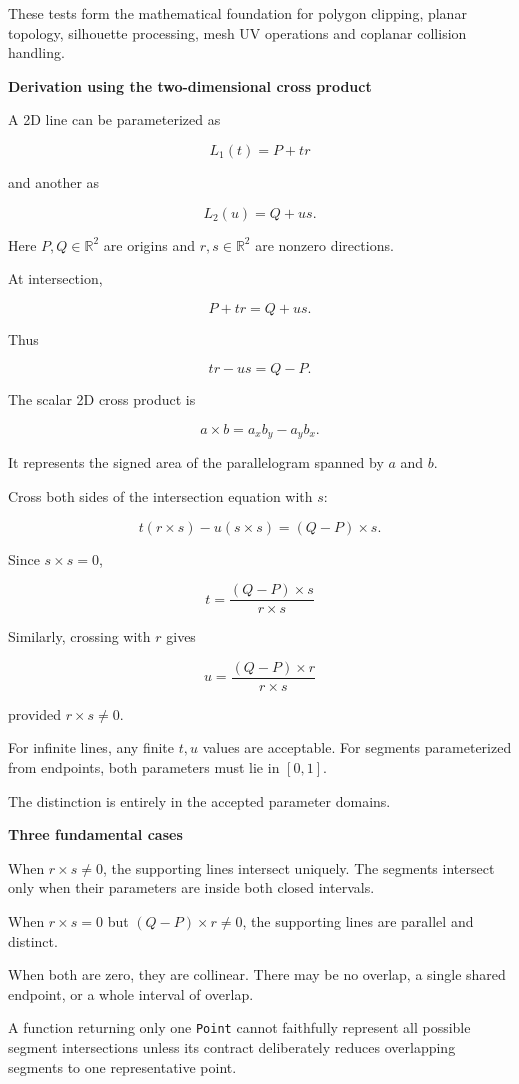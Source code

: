 These tests form the mathematical foundation for polygon clipping, planar topology, silhouette processing, mesh UV operations and coplanar collision handling.

\textbf{Derivation using the two-dimensional cross product}

A 2D line can be parameterized as

\[
L_1(t)=P+tr
\]

and another as

\[
L_2(u)=Q+us.
\]

Here \(P,Q\in\mathbb R^2\) are origins and \(r,s\in\mathbb R^2\) are nonzero directions.

At intersection,

\[
P+tr=Q+us.
\]

Thus

\[
tr-us=Q-P.
\]

The scalar 2D cross product is

\[
a\times b=a_xb_y-a_yb_x.
\]

It represents the signed area of the parallelogram spanned by \(a\) and \(b\).

Cross both sides of the intersection equation with \(s\):

\[
t(r\times s)-u(s\times s)=(Q-P)\times s.
\]

Since \(s\times s=0\),

\[
\boxed{ t=\frac{(Q-P)\times s}{r\times s} }
\]

Similarly, crossing with \(r\) gives

\[
\boxed{ u=\frac{(Q-P)\times r}{r\times s} }
\]

provided \(r\times s\ne0\).

For infinite lines, any finite \(t,u\) values are acceptable. For segments parameterized from endpoints, both parameters must lie in \([0,1]\).

The distinction is entirely in the accepted parameter domains.

\textbf{Three fundamental cases}

When \(r\times s\ne0\), the supporting lines intersect uniquely. The segments intersect only when their parameters are inside both closed intervals.

When \(r\times s=0\) but \((Q-P)\times r\ne0\), the supporting lines are parallel and distinct.

When both are zero, they are collinear. There may be no overlap, a single shared endpoint, or a whole interval of overlap.

A function returning only one \texttt{Point} cannot faithfully represent all possible segment intersections unless its contract deliberately reduces overlapping segments to one representative point.

